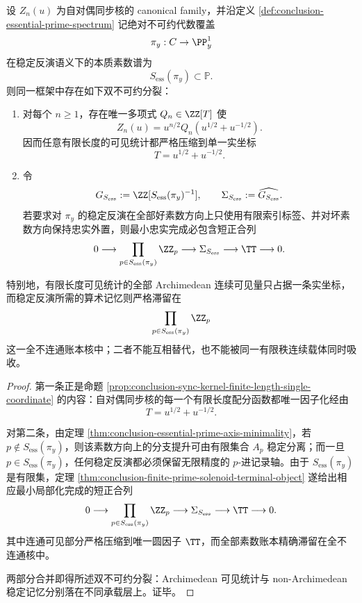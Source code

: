 \begin{theorem}\label{thm:conclusion-finite-visible-archimedean-essential-prime-ledger-splitting}
设 \(Z_n(u)\) 为自对偶同步核的 canonical family，并沿定义 \ref{def:conclusion-essential-prime-spectrum} 记绝对不可约代数覆盖
\[
\pi_y:C\to \PP^1_y
\]
在稳定反演语义下的本质素数谱为
\[
S_{\mathrm{ess}}(\pi_y)\subset \mathbb P.
\]
则同一框架中存在如下双不可约分裂：
\begin{enumerate}
  \item 对每个 \(n\ge 1\)，存在唯一多项式 \(Q_n\in\ZZ[T]\) 使
  \[
  Z_n(u)=u^{n/2}Q_n\!\left(u^{1/2}+u^{-1/2}\right).
  \]
  因而任意有限长度的可见统计都严格压缩到单一实坐标
  \[
  T=u^{1/2}+u^{-1/2}.
  \]
  \item 令
  \[
  G_{S_{\mathrm{ess}}}:=\ZZ[S_{\mathrm{ess}}(\pi_y)^{-1}],
  \qquad
  \Sigma_{S_{\mathrm{ess}}}:=\widehat{G_{S_{\mathrm{ess}}}}.
  \]
  若要求对 \(\pi_y\) 的稳定反演在全部好素数方向上只使用有限索引标签、并对坏素数方向保持忠实外置，则最小忠实完成必包含短正合列
  \[
  0\longrightarrow \prod_{p\in S_{\mathrm{ess}}(\pi_y)}\ZZ_p
  \longrightarrow \Sigma_{S_{\mathrm{ess}}}
  \longrightarrow \TT
  \longrightarrow 0.
  \]
\end{enumerate}
特别地，有限长度可见统计的全部 Archimedean 连续可见量只占据一条实坐标，而稳定反演所需的算术记忆则严格滞留在
\[
\prod_{p\in S_{\mathrm{ess}}(\pi_y)}\ZZ_p
\]
这一全不连通账本核中；二者不能互相替代，也不能被同一有限秩连续载体同时吸收。
\end{theorem}
\begin{proof}
第一条正是命题 \ref{prop:conclusion-sync-kernel-finite-length-single-coordinate} 的内容：自对偶同步核的每一个有限长度配分函数都唯一因子化经由
\[
T=u^{1/2}+u^{-1/2}.
\]

对第二条，由定理 \ref{thm:conclusion-essential-prime-axis-minimality}，若 \(p\notin S_{\mathrm{ess}}(\pi_y)\)，则该素数方向上的分支提升可由有限集合 \(A_p\) 稳定分离；而一旦 \(p\in S_{\mathrm{ess}}(\pi_y)\)，任何稳定反演都必须保留无限精度的 \(p\)-进记录轴。由于 \(S_{\mathrm{ess}}(\pi_y)\) 是有限集，定理 \ref{thm:conclusion-finite-prime-solenoid-terminal-object} 遂给出相应最小局部化完成的短正合列
\[
0\longrightarrow \prod_{p\in S_{\mathrm{ess}}(\pi_y)}\ZZ_p
\longrightarrow \Sigma_{S_{\mathrm{ess}}}
\longrightarrow \TT
\longrightarrow 0.
\]
其中连通可见部分严格压缩到唯一圆因子 \(\TT\)，而全部素数账本精确滞留在全不连通核中。

两部分合并即得所述双不可约分裂：Archimedean 可见统计与 non-Archimedean 稳定记忆分别落在不同承载层上。证毕。
\end{proof}


